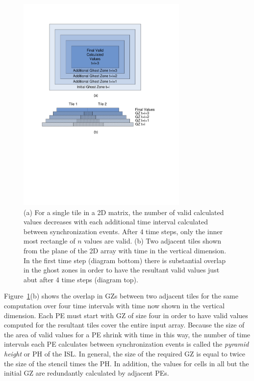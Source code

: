 \documentclass[preprint,nocopyrightspace]{styles/sigplanconf}
\begin{document}
\begin{figure}
\includegraphics[clip,trim=1.0in 3.5in 1.3in 1.0in,width=3.3in]{figures/Diagrams}
\caption{(a) For a single tile in a 2D matrix, the number of valid calculated
values decreases with each additional time interval calculated between 
synchronization events.  After 4 time steps, only the inner most rectangle
of $n$ values are valid.  (b)  Two adjacent tiles shown from the plane of the 2D array
with time in the vertical dimension.  In the first time step 
(diagram bottom) there is substantial overlap in the ghost
zones in order to have the resultant valid values just abut after 4 time steps 
(diagram top).}
\label{fig:trapezoid}
\end{figure}

Figure~\ref{fig:trapezoid}(b) shows the overlap in GZs between two adjacent
tiles for the same computation over four time intervals with time now shown in
the vertical dimension.  Each PE must start with GZ of size four in order to
have valid values computed for the resultant tiles cover the entire input
array.  Because the size of the area of valid values for a PE shrink with time
in this way, the number of time intervals each PE calculates between
synchronization events is called the {\em pyramid height} or PH of the ISL.  In
general, the size of the required GZ is equal to twice the size of the stencil
times the PH.  In addition, the values for cells in all but the initial GZ are
redundantly calculated by adjacent PEs.
\end{document}
